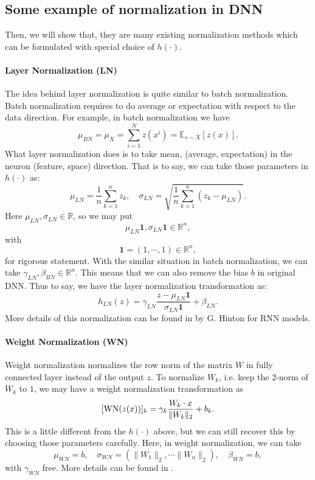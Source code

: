 \subsection{Some example of normalization in DNN}
Then, we will show that, they are many existing normalization methods which can be formulated with 
special choice of $h(\cdot)$.

\paragraph{Layer Normalization (LN)}
The idea behind layer normalization is quite similar to batch normalization.
Batch normalization requires to do average or expectation with respect to the data direction.
For example, in batch normalization we have
$$
\mu_{BN} = \mu_X = \sum_{i=1}^N z(x^i) = \mathbb{E}_{s \sim X}[ z(x)].
$$
What layer normalization does is to take mean, (average, expectation) in the neuron (feature, space) direction.
That is to say, we can take those parameters in $h(\cdot)$ as:
\begin{equation}\label{eq:LN-mu}
\mu_{LN} = \frac{1}{n}\sum_{k=1}^n z_k, \quad \sigma_{LN}=\sqrt{\frac{1}{n}\sum_{k=1}^{n}(z_k-\mu_{LN})}.
\end{equation}
Here $\mu_{LN}  ,  \sigma_{LN} \in \mathbb{R}$, so we may put 
$$ 
\mu_{LN} \bm 1,  \sigma_{LN} \bm 1 \in \mathbb{R}^n,
$$
with 
$$
\bm 1 = (1, \cdots, 1) \in \mathbb{R}^n,
$$
for rigorous statement. 
With the similar situation in batch normalization, we can take $\gamma_{LN}, \beta_{BN} \in \mathbb{R}^n$. This means that
we can also remove the bias $b$ in original DNN.
Thus to say, we have the layer normalization transformation as:
\begin{equation}\label{eq:LN-h}
h_{LN}(z) = \gamma_{LN} \frac{z - \mu_{LN}\bm 1}{\sigma_{LN} \bm 1} + \beta_{LN}.
\end{equation}
More details of this normalization can be found in \cite{ba2016layer} by G. Hinton for RNN models.


\paragraph{Weight Normalization (WN)}
Weight normalization  normalizes the 
row norm of the matrix  $W$ in fully connected layer instead of 
the output $z$.
To normalize $W_k$, i.e. keep the 2-norm of $W_k$ to $1$, we may 
have a weight normalization transformation as
$$
[{\rm WN}(z(x)) ]_k= \gamma_k \frac{W_k \cdot x}{\|W_k\|_{2}} + b_k.
$$
This is a little different from the $h(\cdot)$ above, but we can still recover this
by choosing those parameters carefully.
Here, in weight normalization, we can take 
\begin{equation}
\mu_{WN} = b,\quad  \sigma_{WN} = \left( \|W_1\|_{2}, \cdots \|W_n\|_{2}\right),\quad \beta_{WN} = b,
\end{equation}
with $\gamma_{WN}$ free.
More details can be found in \cite{salimans2016weight}.

